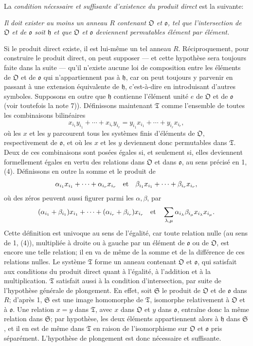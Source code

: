 La \emph{condition nécessaire et suffisante d'existence du produit direct} est la suivante:

\emph{Il doit exister au moins un anneau \(R\) contenant \(\mathfrak O\) et \(\mathfrak o\), tel que l'intersection de \(\mathfrak O\) et de \(\mathfrak o\) soit \(\mathfrak h\) et que \(\mathfrak O\) et \(\mathfrak o\) deviennent permutables élément par élément.}

Si le produit direct existe, il est lui-même un tel anneau \(R\). Réciproquement, pour construire le produit direct, on peut supposer --- et cette hypothèse sera toujours faite dans la suite --- qu'il n'existe aucune loi de composition entre les éléments de \(\mathfrak O\) et de \(\mathfrak o\) qui n'appartiennent pas à \(\mathfrak h\), car on peut toujours y parvenir en passant à une extension équivalente de \(\mathfrak h\), c'est-à-dire en introduisant d'autres symboles. Supposons en outre que \(\mathfrak h\) contienne l'élément unité \(e\) de \(\mathfrak O\) et de \(\mathfrak o\) (voir toutefois la note 7)). Définissons maintenant \(\mathfrak T\) comme l'ensemble de toutes les combinaisons bilinéaires
\[
x_{i_1}y_{i_1}+\cdots+x_{i_r}y_{i_r}
=y_{i_1}x_{i_1}+\cdots+y_{i_r}x_{i_r},
\]
où les \(x\) et les \(y\) parcourent tous les systèmes finis d'éléments de \(\mathfrak O\), respectivement de \(\mathfrak o\), et où les \(x\) et les \(y\) deviennent donc permutables dans \(\mathfrak T\). Deux de ces combinaisons sont posées égales si, et seulement si, elles deviennent formellement égales en vertu des relations dans \(\mathfrak O\) et dans \(\mathfrak o\), au sens précisé en 1, (4). Définissons en outre la somme et le produit de
\[
\alpha_{i_1}x_{i_1}+\cdots+\alpha_{i_r}x_{i_r}
\quad\hbox{et}\quad
\beta_{i_1}x_{i_1}+\cdots+\beta_{i_r}x_{i_r},
\]
où des zéros peuvent aussi figurer parmi les \(\alpha,\beta\), par
\[
(\alpha_{i_1}+\beta_{i_1})x_{i_1}+\cdots+(\alpha_{i_r}+\beta_{i_r})x_{i_r}
\quad\hbox{et}\quad
\sum_{\lambda,\mu}\alpha_{i_\lambda}\beta_{i_\mu}x_{i_\lambda}x_{i_\mu}.
\]
Cette définition est univoque au sens de l'égalité, car toute relation nulle (au sens de 1, (4)), multipliée à droite ou à gauche par un élément de \(\mathfrak o\) ou de \(\mathfrak O\), est encore une telle relation; il en va de même de la somme et de la différence de ces relations nulles. Le système \(\mathfrak T\) forme un anneau contenant \(\mathfrak O\) et \(\mathfrak o\), qui satisfait aux conditions du produit direct quant à l'égalité, à l'addition et à la multiplication. \(\mathfrak T\) satisfait aussi à la condition d'intersection, par suite de l'hypothèse générale de plongement. En effet, soit \(\mathfrak S\) le produit de \(\mathfrak O\) et de \(\mathfrak o\) dans \(R\); d'après 1, \(\mathfrak S\) est une image homomorphe de \(\mathfrak T\), isomorphe relativement à \(\mathfrak O\) et à \(\mathfrak o\). Une relation \(x=y\) dans \(\mathfrak T\), avec \(x\) dans \(\mathfrak O\) et \(y\) dans \(\mathfrak o\), entraîne donc la même relation dans \(\mathfrak S\); par hypothèse, les deux éléments appartiennent alors à \(\mathfrak h\) dans \(\mathfrak S\), et il en est de même dans \(\mathfrak T\) en raison de l'isomorphisme sur \(\mathfrak O\) et \(\mathfrak o\) pris séparément. L'hypothèse de plongement est donc nécessaire et suffisante.

